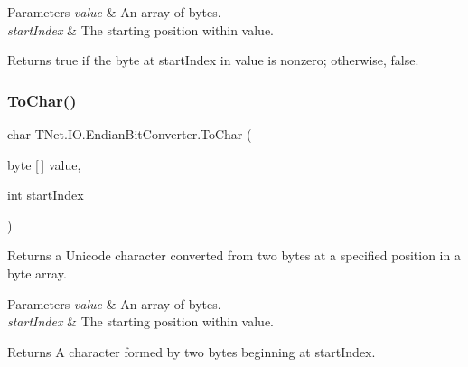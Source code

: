 \begin{DoxyParams}{Parameters}
{\em value} & An array of bytes.\\
\hline
{\em start\+Index} & The starting position within value.\\
\hline
\end{DoxyParams}
\begin{DoxyReturn}{Returns}
true if the byte at start\+Index in value is nonzero; otherwise, false.
\end{DoxyReturn}
\mbox{\label{class_t_net_1_1_i_o_1_1_endian_bit_converter_a04b97d937753db34e5184a3f9140a644}} 
\subsubsection{\texorpdfstring{To\+Char()}{ToChar()}}
{\footnotesize\ttfamily char T\+Net.\+I\+O.\+Endian\+Bit\+Converter.\+To\+Char (\begin{DoxyParamCaption}\item[{byte \mbox{[}$\,$\mbox{]}}]{value,  }\item[{int}]{start\+Index }\end{DoxyParamCaption})}



Returns a Unicode character converted from two bytes at a specified position in a byte array. 


\begin{DoxyParams}{Parameters}
{\em value} & An array of bytes.\\
\hline
{\em start\+Index} & The starting position within value.\\
\hline
\end{DoxyParams}
\begin{DoxyReturn}{Returns}
A character formed by two bytes beginning at start\+Index.
\end{DoxyReturn}
\mbox{\label{class_t_net_1_1_i_o_1_1_endian_bit_converter_a226ca2d24192152238c46c2a47bc5c24}} 
